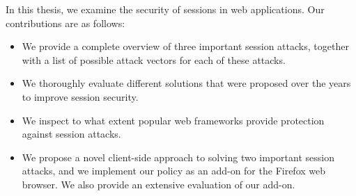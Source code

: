 In this thesis, we examine the security of sessions in web applications. Our contributions are as follows:
\begin{itemize}
	\item We provide a complete overview of three important session attacks, together with a list of possible attack vectors for each of these attacks.
	\item We thoroughly evaluate different solutions that were proposed over the years to improve session security.
	\item We inspect to what extent popular web frameworks provide protection against session attacks.
	\item We propose a novel client-side approach to solving two important session attacks, and we implement our policy as an add-on for the Firefox web browser. We also provide an extensive evaluation of our add-on.
\end{itemize}

